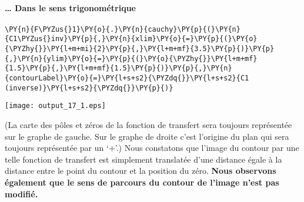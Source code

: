 \paragraph{\ldots{} Dans le sens trigonométrique\label{dans-le-sens-trigonomuxe9trique}}
\begin{tcolorbox}[breakable, size=fbox, boxrule=1pt, pad at break*=1mm,colback=cellbackground, colframe=cellborder]
\begin{Verbatim}[commandchars=\\\{\}]
\PY{n}{F\PYZus{}1}\PY{o}{.}\PY{n}{cauchy}\PY{p}{(}\PY{n}{C1\PYZus{}inv}\PY{p}{,}\PY{n}{xlim}\PY{o}{=}\PY{p}{(}\PY{o}{\PYZhy{}}\PY{l+m+mi}{2}\PY{p}{,}\PY{l+m+mf}{3.5}\PY{p}{)}\PY{p}{,}\PY{n}{ylim}\PY{o}{=}\PY{p}{(}\PY{o}{\PYZhy{}}\PY{l+m+mf}{1.5}\PY{p}{,}\PY{l+m+mf}{1.5}\PY{p}{)}\PY{p}{,}\PY{n}{contourLabel}\PY{o}{=}\PY{l+s+s2}{\PYZdq{}}\PY{l+s+s2}{C1 (inverse)}\PY{l+s+s2}{\PYZdq{}}\PY{p}{)}
\end{Verbatim}
\end{tcolorbox}
\begin{center}
    \texttt{[image: output\_17\_1.eps]}
\end{center}
(La carte des pôles et zéros de la fonction de transfert sera toujours
représentée sur le graphe de gauche. Sur le graphe de droite c'est
l'origine du plan qui sera toujours représentée par un `+'.)
Nous constatons que l'image du contour par une telle fonction de
transfert est simplement translatée d'une distance égale à la distance
entre le point du contour et la position du zéro. \textbf{Nous observons
également que le sens de parcours du contour de l'image n'est pas
modifié.}
